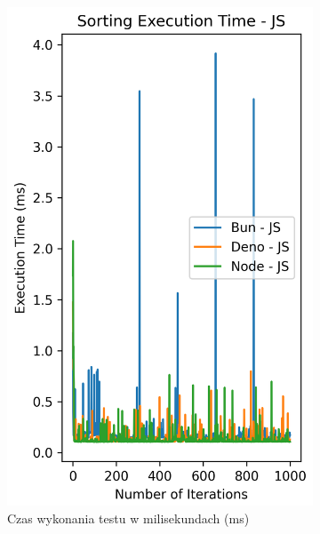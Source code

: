 \begin{figure}[H]
  \centering
  \begin{subfigure}[b]{0.4\textwidth}
    \centering
    \includegraphics[width=\textwidth]{Figures/sorting/sorting_radix_1000_1000_js_time.png}
    \caption{Czas wykonania testu w milisekundach (ms)}
    \label{fig:radix_sorting_e2_time}
  \end{subfigure}
  \begin{subfigure}[b]{0.4\textwidth}
    \centering

\end{subfigure}
\end{figure}

